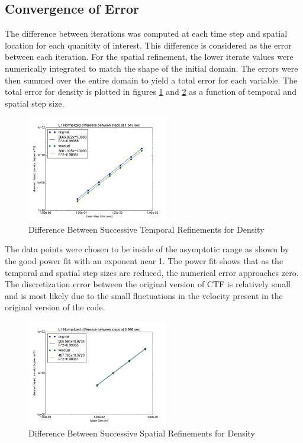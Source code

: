 \documentclass{mc2015}
\begin{document}
\subsection{Convergence of Error}

The difference between iterations was computed at each time step and spatial
location for each quanitity of interest. This difference is considered as the
error between each iteration. For the spatial refinement, the lower iterate
values were numerically integrated to match the shape of the initial domain. The
errors were then summed over the entire domain to yield a total error for each
variable. The total error for density is plotted in figures
\ref{fig:Temporal:Diff_rho} and \ref{fig:Spatial:Diff_rho} as a function of
temporal and spatial step size.

\begin{figure}[!h]
	\centering
	\includegraphics[width=0.55\textwidth]{images/Temporal_Study/Difference_rho}
	\caption{Difference Between Successive Temporal Refinements for Density}
	\label{fig:Temporal:Diff_rho}
\end{figure} 

The data points were chosen to be inside of the asymptotic range as shown by
the good power fit with an exponent near 1. The power fit shows that as the
temporal and spatial step sizes are reduced, the numerical error approaches
zero. The discretization error between the original version of CTF is
relatively small and is most likely due to the small fluctuations in the
velocity present in the original version of the code. 

\begin{figure}[!h]
	\centering
	\includegraphics[width=0.55\textwidth]{images/Spatial_Study/Difference_rho}
	\caption{Difference Between Successive Spatial Refinements for Density}
	\label{fig:Spatial:Diff_rho}
\end{figure} 
\end{document}

